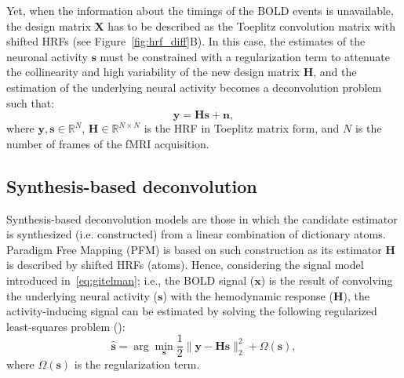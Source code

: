 Yet, when the information about the timings of the BOLD events is unavailable, the design matrix \(\mathbf{X}\) has to be described as the Toeplitz convolution matrix with shifted HRFs (see Figure~\ref{fig:hrf_diff}B). In this case, the estimates of the neuronal activity \(\mathbf{s}\) must be constrained with a regularization term to attenuate the collinearity and high variability of the new design matrix \(\mathbf{H}\), and the estimation of the underlying neural activity becomes a deconvolution problem such that:
\begin{equation}
    \label{eq:deconvolution}
    \mathbf{y} = \mathbf{Hs} + \mathbf{n},
\end{equation}
where \(\mathbf{y, s} \in \mathbb{R}^N\), \(\mathbf{H} \in \mathbb{R}^{N \times N}\) is the HRF in Toeplitz matrix form, and \(N\) is the number of frames of the fMRI acquisition.


\subsection{Synthesis-based deconvolution}

Synthesis-based deconvolution models are those in which the candidate estimator is synthesized (i.e. constructed) from a linear combination of dictionary atoms. Paradigm Free Mapping (PFM) is based on such construction as its estimator \(\mathbf{H}\) is described by shifted HRFs (atoms). Hence, considering the signal model introduced in~\eqref{eq:gitelman}; i.e., the BOLD signal (\(\mathbf{x}\)) is the result of convolving the underlying neural activity (\(\mathbf{s}\)) with the hemodynamic response (\(\mathbf{H}\)), the activity-inducing signal can be estimated by solving the following regularized least-squares problem (\citealt{gaudes2011DetectionCharacterizationSingletrial,caballerogaudes2013ParadigmFreeMapping,urunuela2020StabilityBasedSparseParadigm}):
\begin{equation}
    \label{eq:pfm}
    \hat{\mathbf{s}} = \arg \min_{\mathbf{s}} \frac{1}{2} \| \mathbf{y} - \mathbf{Hs} \|_2^2 + \Omega(\mathbf{s}),
\end{equation}
where \(\Omega(\mathbf{s})\) is the regularization term.


